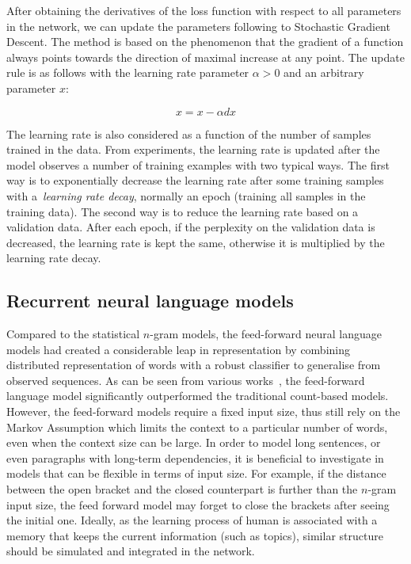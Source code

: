 After obtaining the derivatives of the loss function with respect to all parameters in the network, we can update the parameters following to Stochastic Gradient Descent. The method is based on the phenomenon that the gradient of a function always points towards the direction of maximal increase at any point. The update rule is as follows with the learning rate parameter $\alpha > 0$ and an arbitrary parameter $x$:

\begin{equation}
x = x - \alpha dx
\label{eq:sgd}
\end{equation}

The learning rate is also considered as a function of the number of samples trained in the data. From experiments, the learning rate is updated after the model observes a number of training examples with two typical ways. The first way is to exponentially decrease the learning rate after some training samples with a~\textit{learning rate decay}, normally an epoch (training all samples in the training data). The second way is to reduce the learning rate based on a validation data. After each epoch, if the perplexity on the validation data is decreased, the learning rate is kept the same, otherwise it is multiplied by the learning rate decay.
 
\subsection{Recurrent neural language models}

Compared to the statistical $n$-gram models, the feed-forward neural language models had created a considerable leap in representation by combining distributed representation of words with a robust classifier to generalise from observed sequences. As can be seen from various works~\cite{schwenk2007continuous,le2011structured}, the feed-forward language model significantly outperformed the traditional count-based models. However, the feed-forward models require a fixed input size, thus still rely on the Markov Assumption which limits the context to a particular number of words, even when the context size can be large. In order to model long sentences, or even paragraphs with long-term dependencies, it is beneficial to investigate in models that can be flexible in terms of input size. For example, if the distance between the open bracket and the closed counterpart is further than the $n$-gram input size, the feed forward model may forget to close the brackets after seeing the initial one. Ideally, as the learning process of human is associated with a memory that keeps the current information (such as topics), similar structure should be simulated and integrated in the network.

